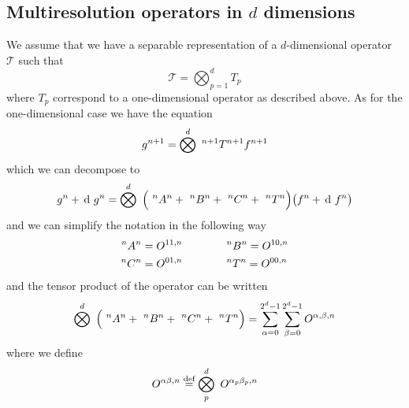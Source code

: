 
\subsection{Multiresolution operators in $d$ dimensions}
We assume that we have a separable representation of a $d$-dimensional
operator $\mathcal{T}$ such that
\begin{equation}
    \mathcal{T} = \bigotimes_{p=1}^d T_p
\end{equation}
where $T_p$ correspond to a one-dimensional operator as described above.
As for the one-dimensional case we have the equation
\begin{equation}
    {g}^{n+1} = \bigotimes^d\ ^{n+1}T^{n+1} {f}^{n+1}
\end{equation}
which we can decompose to
\begin{equation}
    \scalingrep{g}{n} + \waveletrep{g}{n} = 
	\bigotimes^d\ \Big(\ \A{n}{n} +\ \B{n}{n} +\ \C{n}{n}+\ \T{n}{n}\Big) 
	\big(\scalingrep{f}{n} + \waveletrep{f}{n}\big)
\end{equation}
and we can simplify the notation in the following way
\begin{align}
    \begin{split}
        ^{n}A^{n} &= O^{11,n} \qquad \qquad
	^{n}B^{n} = O^{10,n} \\
	^{n}C^{n} &= O^{01,n} \qquad \qquad
	^{n}T^{n} = O^{00,n}
    \end{split}
\end{align}
and the tensor product of the operator can be written
\begin{equation}
    \bigotimes^d\ \Big(\ \A{n}{n}+\ \B{n}{n} +\ \C{n}{n}+\ \T{n}{n}\Big) =
	\sum_{\alpha=0}^{2^d-1} \sum_{\beta=0}^{2^d-1} O^{\alpha,\beta,n}
\end{equation}
where we define
\begin{equation}
    O^{\alpha\beta,n} \mydef \bigotimes_{p}^d\ O^{\alpha_p\beta_p,n}
\end{equation}

